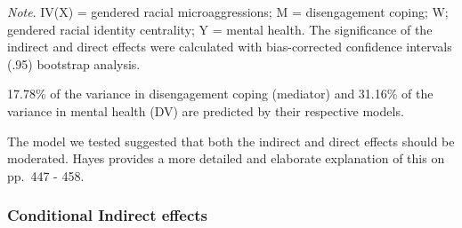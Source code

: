 \documentclass[
  english,
]{book}
\begin{document}
\begin{longtable}[]{@{}l@{}}
\toprule
 \\
\midrule
\endhead
\bottomrule
\end{longtable}

\emph{Note}. IV(X) = gendered racial microaggressions; M = disengagement coping; W; gendered racial identity centrality; Y = mental health. The significance of the indirect and direct effects were calculated with bias-corrected confidence intervals (.95) bootstrap analysis.

17.78\% of the variance in disengagement coping (mediator) and 31.16\% of the variance in mental health (DV) are predicted by their respective models.

The model we tested suggested that both the indirect and direct effects should be moderated. Hayes provides a more detailed and elaborate explanation of this on pp.~447 - 458.

\hypertarget{conditional-indirect-effects}{%
\subsubsection{Conditional Indirect effects}\label{conditional-indirect-effects}}
\end{document}
